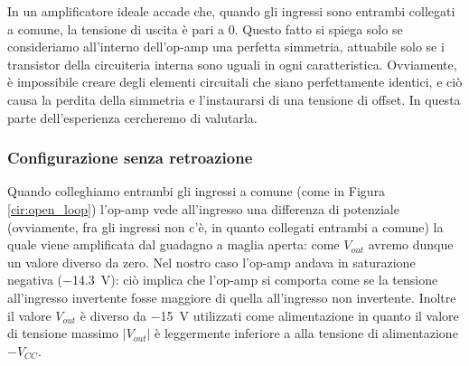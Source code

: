 In un amplificatore ideale accade che, quando gli ingressi sono entrambi collegati a comune, la tensione di uscita è pari a $0$. Questo fatto si spiega solo se consideriamo all'interno dell'op-amp una perfetta simmetria, attuabile solo se i transistor della circuiteria interna sono uguali in ogni caratteristica. Ovviamente, è impossibile creare degli elementi circuitali che siano perfettamente identici, e ciò causa la perdita della simmetria e l'instaurarsi di una tensione di offset. In questa parte dell'esperienza cercheremo di valutarla.

\subsubsection{Configurazione senza retroazione}

Quando colleghiamo entrambi gli ingressi a comune (come in Figura \ref{cir:open_loop}) l'op-amp vede all'ingresso una differenza di potenziale (ovviamente, fra gli ingressi non c'è, in quanto collegati entrambi a comune) la quale viene amplificata dal guadagno a maglia aperta: come $V_{out}$ avremo dunque un valore diverso da zero. Nel nostro caso l'op-amp andava in saturazione negativa (\SI{-14.3}{\volt}): ciò implica che l'op-amp si comporta come se la tensione all'ingresso invertente fosse maggiore di quella all'ingresso non invertente. Inoltre il valore $V_{out}$ è diverso da \SI{-15}{\volt} utilizzati come alimentazione in quanto il valore di tensione massimo $|V_{out}|$ è leggermente inferiore a alla tensione di alimentazione $-V_{CC}$.

